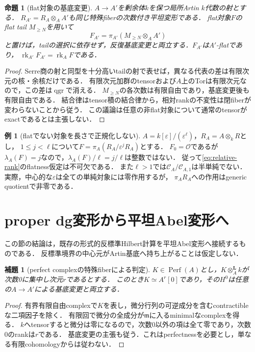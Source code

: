 \documentclass[11pt,a4paper]{ltjsarticle}
\newtheorem{proposition}[theorem]{命題}
\newtheorem{lemma}[theorem]{補題}
\theoremstyle{definition}
\newtheorem{example}[theorem]{例}
\newcommand{\OO}{\mathcal O}
\newcommand{\CC}{\mathcal C}
\newcommand{\mm}{\mathfrak m}
\newcommand{\qgr}{\operatorname{qgr}}
\newcommand{\Perf}{\operatorname{Perf}}
\newcommand{\rk}{\operatorname{rk}}
\begin{document}
\begin{proposition}[flat対象の基底変更]\label{prop:flat-base-change}
$A\to A'$を剰余体$k$を保つ局所Artin $k$代数の射とする．
$R_{A'}=R_A\otimes_AA'$も同じ特殊fiberの次数付き平坦変形である．
flat対象$F$のflat tail $M_{\geq N}$を用いて
\[
 F_{A'}=\pi_{A'}(M_{\geq N}\otimes_AA')
\]
と置けば，tailの選択に依存せず，反復基底変更と両立する．$F_{A'}$は$A'$-flatであり，
$\rk_{A'}F_{A'}=\rk_AF$である．
\end{proposition}
\begin{proof}
Serre商の射と同型を十分高いtailの射で表せば，異なる代表の差は有限次元の核・余核だけである．
有限次元加群のtensorおよび$A$上のTorは有限次元なので，この差は$\qgr$で消える．
$M_{\geq N}$の各次数は有限自由であり，基底変更後も有限自由である．
結合律はtensor積の結合律から，相対rankの不変性は閉fiberが変わらないことから従う．
この議論は任意の非flat対象について通常のtensorがexactであるとは主張しない．
\end{proof}

\begin{example}[flatでない対象を長さで正規化しない]\label{ex:nonflat}
$A=k[\varepsilon]/(\varepsilon^\ell)$，$R_A=A\otimes_kR$とし，
$1\leq j<\ell$について$F=\pi_A(R_A/\varepsilon^jR_A)$とする．
$F_0=\OO$であるが$\lambda_A(F)=j$なので，$\lambda_A(F)/\ell=j/\ell$は整数ではない．
従って\eqref{eq:relative-rank}のflatness仮定は不可欠である．
また$\ell>1$では$\CC_A/\CC_{A,1}$は半単純でない．
実際，中心的な$\varepsilon$は全ての単純対象には零作用するが，
$\pi_A R_A$への作用はgeneric quotientで非零である．
\end{example}

\section{proper dg変形から平坦Abel変形へ}\label{sec:envelope}
この節の結論は，既存の形式的反標準Hilbert計算を平坦Abel変形へ接続するものである．
反標準境界の中心元がArtin基底へ持ち上がることは仮定しない．

\begin{lemma}[perfect complexの特殊fiberによる判定]\label{lem:perfect-fiber}
$K\in\Perf(A)$とし，$K\otimes_A^{\mathbf L}k$が次数0に集中し次元$r$であるとする．
このとき$K\simeq A^r[0]$であり，その$H^0$は任意の$A\to A'$による基底変更と両立する．
\end{lemma}
\begin{proof}
有界有限自由complexで$K$を表し，微分行列の可逆成分を含むcontractibleな二項因子を除く．
有限回で微分の全成分が$\mm$に入るminimalなcomplexを得る．
$k$へtensorすると微分は零になるので，次数0以外の項は全て零であり，次数0のrankは$r$である．
基底変更の主張も従う．これはperfectnessを必要とし，単なる有限cohomologyからは従わない．
\end{proof}
\end{document}
